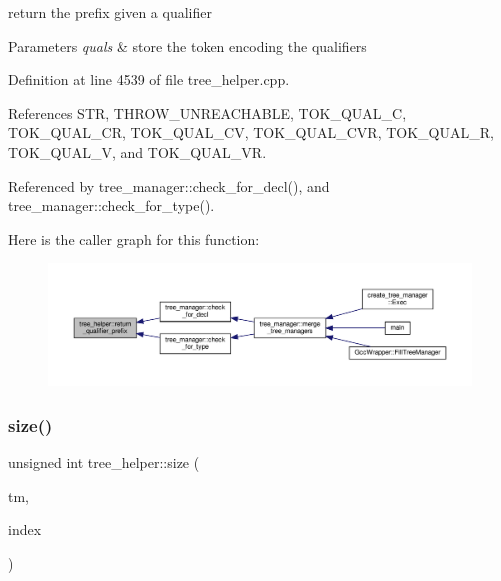 return the prefix given a qualifier 


\begin{DoxyParams}{Parameters}
{\em quals} & store the token encoding the qualifiers \\
\hline
\end{DoxyParams}


Definition at line 4539 of file tree\+\_\+helper.\+cpp.



References S\+TR, T\+H\+R\+O\+W\+\_\+\+U\+N\+R\+E\+A\+C\+H\+A\+B\+LE, T\+O\+K\+\_\+\+Q\+U\+A\+L\+\_\+C, T\+O\+K\+\_\+\+Q\+U\+A\+L\+\_\+\+CR, T\+O\+K\+\_\+\+Q\+U\+A\+L\+\_\+\+CV, T\+O\+K\+\_\+\+Q\+U\+A\+L\+\_\+\+C\+VR, T\+O\+K\+\_\+\+Q\+U\+A\+L\+\_\+R, T\+O\+K\+\_\+\+Q\+U\+A\+L\+\_\+V, and T\+O\+K\+\_\+\+Q\+U\+A\+L\+\_\+\+VR.



Referenced by tree\+\_\+manager\+::check\+\_\+for\+\_\+decl(), and tree\+\_\+manager\+::check\+\_\+for\+\_\+type().

Here is the caller graph for this function\+:
\nopagebreak
\begin{figure}[H]
\begin{center}
\leavevmode
\includegraphics[width=350pt]{d7/d99/classtree__helper_a48ef1be9a6f2556d79102ba30cac4190_icgraph}
\end{center}
\end{figure}
\mbox{\label{classtree__helper_a1dfdf8e77d57c307c0860c91d8c2b67d}} 
\subsubsection{\texorpdfstring{size()}{size()}}
{\footnotesize\ttfamily unsigned int tree\+\_\+helper\+::size (\begin{DoxyParamCaption}\item[{const \hyperlink{tree__manager_8hpp_a792e3f1f892d7d997a8d8a4a12e39346}{tree\+\_\+manager\+Const\+Ref}}]{tm,  }\item[{const unsigned int}]{index }\end{DoxyParamCaption})\hspace{0.3cm}{\ttfamily [static]}}



